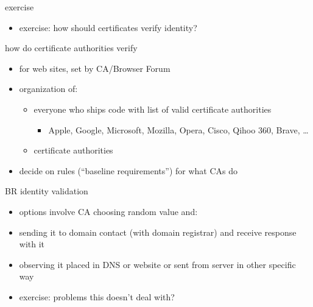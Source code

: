 \begin{frame}{exercise}
    \begin{itemize}
    \item exercise: how should certificates verify identity?
    \end{itemize}
\end{frame}

\begin{frame}{how do certificate authorities verify}
    \begin{itemize}
        \item for web sites, set by CA/Browser Forum
        \item organization of:
            \begin{itemize}
            \item everyone who ships code with list of valid certificate authorities
                \begin{itemize}
                \item Apple, Google, Microsoft, Mozilla, Opera, Cisco, Qihoo 360, Brave, \ldots
                \end{itemize}
            \item certificate authorities
            \end{itemize}
        \item decide on rules (``baseline requirements'') for what CAs do
    \end{itemize}
\end{frame}

\begin{frame}{BR identity validation}
    \begin{itemize}
        \item options involve CA choosing random value and:
        \vspace{.5cm}
        \item sending it to domain contact (with domain registrar) and receive response with it
        \item observing it placed in DNS or website or sent from server in other specific way
        \vspace{1cm}
        \item exercise: problems this doesn't deal with?
    \end{itemize}
\end{frame}
